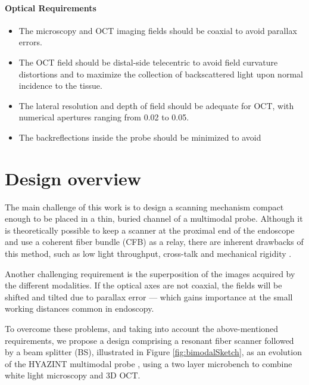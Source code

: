 \paragraph{Optical Requirements}

\begin{itemize}
\item The microscopy and OCT imaging fields should be coaxial to avoid parallax errors. 
\item The OCT field should be distal-side telecentric to avoid field curvature distortions and to maximize the collection of backscattered light upon normal incidence to the tissue.
\item The lateral resolution and depth of field should be adequate for OCT, with numerical apertures ranging from 0.02 to 0.05.
\item The backreflections inside the probe should be minimized to avoid 
\end{itemize}

  

\section{Design overview}

The main challenge of this work is to design a scanning mechanism compact enough to be placed in a thin, buried channel of a multimodal probe.  Although it is theoretically possible to keep a scanner at the proximal end of the endoscope and use a coherent fiber bundle (CFB) as a relay, there are inherent drawbacks of this method, such as low light throughput, cross-talk and mechanical rigidity \cite{Ford2009}. 

Another challenging requirement is the superposition of the images acquired by the different modalities. If the optical axes are not coaxial, the fields will be shifted and tilted due to parallax error --- which gains importance at the small working distances common in endoscopy.

To overcome these problems, and taking into account the above-mentioned requirements, we propose a design comprising a resonant fiber scanner followed by a beam splitter (BS), illustrated in Figure \ref{fig:bimodalSketch}, as an evolution of the HYAZINT multimodal probe \cite{Kretschmer}, using a two layer microbench to combine white light microscopy and 3D OCT. 

